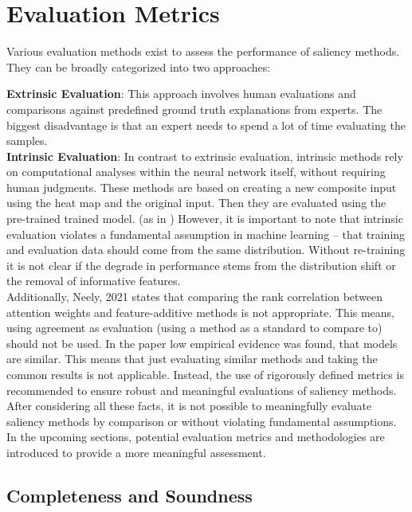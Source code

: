 \chapter{Evaluation Metrics}

Various evaluation methods exist to assess the performance of saliency methods. They can be broadly categorized into two approaches: \cite{gupta2022new}


\textbf{Extrinsic Evaluation}: 
 This approach involves human evaluations and comparisons against predefined ground truth explanations from experts.\cite{zhang2018} The biggest disadvantage is that an expert needs to spend a lot of time evaluating the samples.
\\
\textbf{Intrinsic Evaluation}: 
In contrast to extrinsic evaluation, intrinsic methods rely on computational analyses within the neural network itself, without requiring human judgments. These methods are based on creating a new composite input using the heat map and the original input. Then they are evaluated using the pre-trained trained model. (as in \cite{dabkowski2017real}) However, it is important to note that intrinsic evaluation violates a fundamental assumption in machine learning – that training and evaluation data should come from the same distribution. Without re-training it is not clear if the degrade in performance stems from the distribution shift or the removal of informative features. \cite{hooker2019benchmark}
\\
Additionally, Neely, 2021\cite{neely2021order} states that comparing the rank correlation between attention weights and feature-additive methods is not appropriate. This means, using agreement as evaluation (using a method as a standard to compare to) should not be used. In the paper low empirical evidence was found, that models are similar. This means that just evaluating similar methods and taking the common results is not applicable. Instead, the use of rigorously defined metrics is recommended to ensure robust and meaningful evaluations of saliency methods.
\\
After considering all these facts, it is not possible to meaningfully evaluate saliency methods by comparison or without violating fundamental assumptions. In the upcoming sections, potential evaluation metrics and methodologies are introduced to provide a more meaningful assessment.

\section{Completeness and Soundness}

